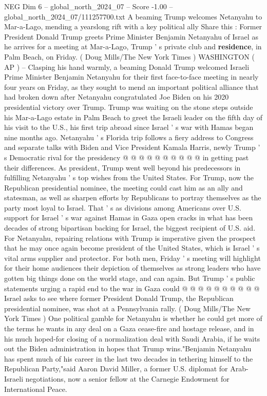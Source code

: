 \begin{textsample}{NEG Dim 6 – global\_north\_2024\_07 – Score -1.00 – global\_north\_2024\_07/111257700.txt}  \label{ex:f6_neg_217}
A beaming Trump welcomes Netanyahu to Mar-a-Lago, mending a yearslong rift with a key political ally Share this : Former President Donald Trump greets Prime Minister Benjamin Netanyahu of Israel as he arrives for a meeting at Mar-a-Lago, Trump ' s private club and \textbf{residence}, in Palm Beach, on Friday. ( Doug Mills/The New York Times ) WASHINGTON ( AP ) -- Clasping his hand warmly, a beaming Donald Trump welcomed Israeli Prime Minister Benjamin Netanyahu for their first face-to-face meeting in nearly four years on Friday, as they sought to mend an important political alliance that had broken down after Netanyahu congratulated Joe Biden on his 2020 presidential victory over Trump.
Trump was waiting on the stone steps outside his Mar-a-Lago estate in Palm Beach to greet the Israeli leader on the fifth day of his visit to the U.S., his first trip abroad since Israel ' s war with Hamas began nine months ago.
Netanyahu ' s Florida trip follows a fiery address to Congress and separate talks with Biden and Vice President Kamala Harris, newly Trump ' s Democratic rival for the presidency @ @ @ @ @ @ @ @ @ @ in getting past their differences.
As president, Trump went well beyond his predecessors in fulfilling Netanyahu ' s top wishes from the United States.
For Trump, now the Republican presidential nominee, the meeting could cast him as an ally and statesman, as well as sharpen efforts by Republicans to portray themselves as the party most loyal to Israel.
That ' s as divisions among Americans over U.S. support for Israel ' s war against Hamas in Gaza open cracks in what has been decades of strong bipartisan backing for Israel, the biggest recipient of U.S. aid.
For Netanyahu, repairing relations with Trump is imperative given the prospect that he may once again become president of the United States, which is Israel ' s vital arms supplier and protector.
For both men, Friday ' s meeting will highlight for their home audiences their depiction of themselves as strong leaders who have gotten big things done on the world stage, and can again.
But Trump ' s public statements urging a rapid end to the war in Gaza could @ @ @ @ @ @ @ @ @ @ Israel asks to see where former President Donald Trump, the Republican presidential nominee, was shot at a Pennsylvania rally. ( Doug Mills/The New York Times ) One political gamble for Netanyahu is whether he could get more of the terms he wants in any deal on a Gaza cease-fire and hostage release, and in his much hoped-for closing of a normalization deal with Saudi Arabia, if he waits out the Biden administration in hopes that Trump wins."Benjamin Netanyahu has spent much of his career in the last two decades in tethering himself to the Republican Party,"said Aaron David Miller, a former U.S. diplomat for Arab-Israeli negotiations, now a senior fellow at the Carnegie Endowment for International Peace.

\end{textsample}
